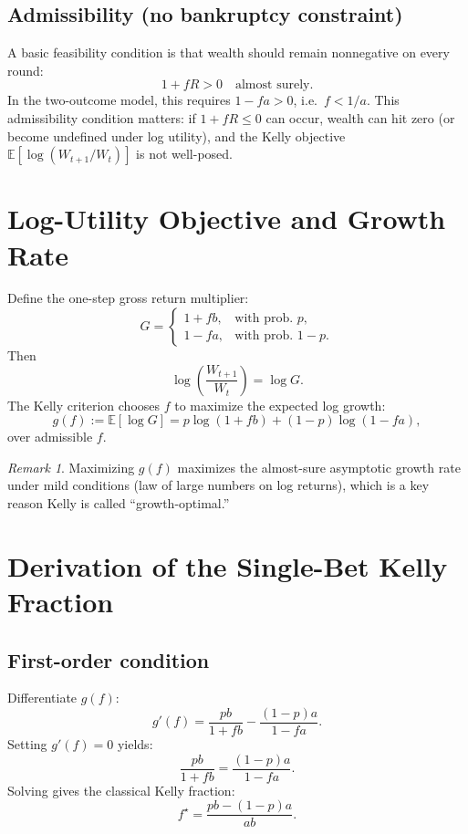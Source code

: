 \documentclass[11pt]{article}
\theoremstyle{plain}
\theoremstyle{definition}
\theoremstyle{remark}
\newtheorem{remark}[theorem]{Remark}
\newcommand{\E}{\mathbb{E}}
\newcommand{\1}{\mathbf{1}}
\begin{document}
\subsection{Admissibility (no bankruptcy constraint)}
A basic feasibility condition is that wealth should remain nonnegative on every round:
\[
1+fR > 0 \quad \text{almost surely}.
\]
In the two-outcome model, this requires $1-fa>0$, i.e.\ $f<1/a$. This admissibility condition matters: if $1+fR\le 0$ can occur, wealth can hit zero (or become undefined under log utility), and the Kelly objective $\E[\log(W_{t+1}/W_t)]$ is not well-posed.

\section{Log-Utility Objective and Growth Rate}
Define the one-step gross return multiplier:
\[
G =
\begin{cases}
1+fb, & \text{with prob. } p,\\
1-fa, & \text{with prob. } 1-p.
\end{cases}
\]
Then
\[
\log\!\left(\frac{W_{t+1}}{W_t}\right) = \log G.
\]
The Kelly criterion chooses $f$ to maximize the expected log growth:
\[
g(f) := \E[\log G] = p\log(1+fb) + (1-p)\log(1-fa),
\]
over admissible $f$.

\begin{remark}
Maximizing $g(f)$ maximizes the almost-sure asymptotic growth rate under mild conditions (law of large numbers on log returns), which is a key reason Kelly is called ``growth-optimal.''
\end{remark}

\section{Derivation of the Single-Bet Kelly Fraction}
\subsection{First-order condition}
Differentiate $g(f)$:
\[
g'(f)= \frac{pb}{1+fb} - \frac{(1-p)a}{1-fa}.
\]
Setting $g'(f)=0$ yields:
\[
\frac{pb}{1+fb} = \frac{(1-p)a}{1-fa}.
\]
Solving gives the classical Kelly fraction:
\begin{equation}
f^\star = \frac{pb-(1-p)a}{ab}.
\label{eq:kelly_single}
\end{equation}
\end{document}
